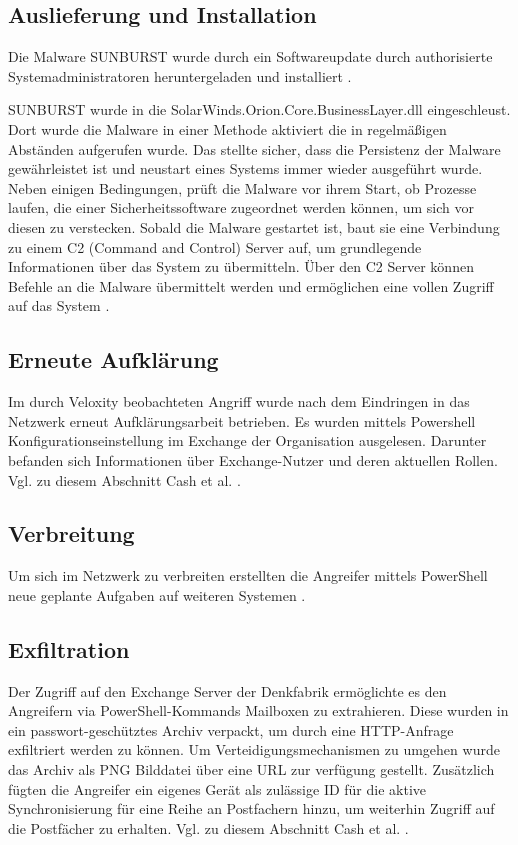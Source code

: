 \documentclass[conference]{IEEEtran}
\begin{document}
\subsection{Auslieferung und Installation}
Die Malware SUNBURST wurde durch ein Softwareupdate durch authorisierte Systemadministratoren heruntergeladen und installiert \cite{FIREEYE2020}.

SUNBURST wurde in die SolarWinds.Orion.Core.BusinessLayer.dll eingeschleust.
Dort wurde die Malware in einer Methode aktiviert die in regelmäßigen Abständen aufgerufen wurde.
Das stellte sicher, dass die Persistenz der Malware gewährleistet ist und neustart eines Systems immer wieder ausgeführt wurde.
Neben einigen Bedingungen, prüft die Malware vor ihrem Start, ob Prozesse laufen, die einer Sicherheitssoftware zugeordnet werden können, um sich vor diesen zu verstecken.
Sobald die Malware gestartet ist, baut sie eine Verbindung zu einem C2 (Command and Control) Server auf, um grundlegende Informationen über das System zu übermitteln.
Über den C2 Server können Befehle an die Malware übermittelt werden und ermöglichen eine vollen Zugriff auf das System \cite{Intelligence2020}.

\subsection{Erneute Aufklärung}
Im durch Veloxity beobachteten Angriff wurde nach dem Eindringen in das Netzwerk erneut Aufklärungsarbeit betrieben.
Es wurden mittels Powershell Konfigurationseinstellung im Exchange der Organisation ausgelesen.
Darunter befanden sich Informationen über Exchange-Nutzer und deren aktuellen Rollen.
Vgl. zu diesem Abschnitt Cash et al. \cite{Cash2020}.

\subsection{Verbreitung}
Um sich im Netzwerk zu verbreiten erstellten die Angreifer mittels PowerShell neue geplante Aufgaben auf weiteren Systemen \cite{Cash2020}.

\subsection{Exfiltration}
Der Zugriff auf den Exchange Server der Denkfabrik ermöglichte es den Angreifern via PowerShell-Kommands Mailboxen zu extrahieren.
Diese wurden in ein passwort-geschütztes Archiv verpackt, um durch eine HTTP-Anfrage exfiltriert werden zu können.
Um Verteidigungsmechanismen zu umgehen wurde das Archiv als PNG Bilddatei über eine URL zur verfügung gestellt.
Zusätzlich fügten die Angreifer ein eigenes Gerät als zulässige ID für die aktive Synchronisierung für eine Reihe an Postfachern hinzu, um weiterhin Zugriff auf die Postfächer zu erhalten.
Vgl. zu diesem Abschnitt Cash et al. \cite{Cash2020}.
\end{document}

